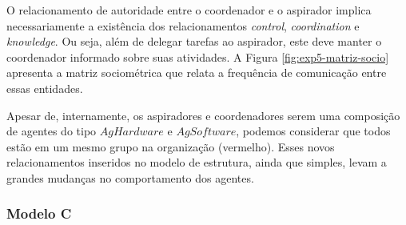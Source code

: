 \begin{figure}[h!]
    \centering
\end{figure}

 O relacionamento de autoridade entre o coordenador e o aspirador implica necessariamente a existência dos relacionamentos \textit{control}, \textit{coordination} e \textit{knowledge}. Ou seja, além de delegar tarefas ao aspirador, este deve manter o coordenador informado sobre suas atividades. A Figura \ref{fig:exp5-matriz-socio} apresenta a matriz sociométrica que relata a frequência de comunicação entre essas entidades. 

\begin{figure}[h!]
    \centering
\end{figure}

Apesar de, internamente, os aspiradores e coordenadores serem uma composição de agentes do tipo $AgHardware$ e $AgSoftware$, podemos considerar que todos estão em um mesmo grupo na organização (vermelho). Esses novos relacionamentos inseridos no modelo de estrutura, ainda que simples, levam a grandes mudanças no comportamento dos agentes.  

\subsubsection{Modelo C}

